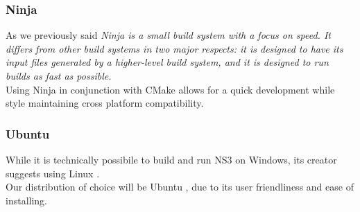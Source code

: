 \subsubsection{Ninja}
As we previously said \textit{Ninja is a small build system with a focus on speed. It differs from other build systems in two major respects: it is designed to have its input files generated by a higher-level build system, and it is designed to run builds as fast as possible.} \cite{ninja}  \\
Using Ninja in conjunction with CMake allows for a quick development while style maintaining cross platform compatibility.

\subsubsection{Ubuntu}
While it is technically possibile to build and run NS3 on Windows, its creator suggests using Linux \cite{ns3-docs} . \\ Our distribution of choice will be Ubuntu  \cite{ubuntu}, due to its user friendliness and ease of installing.
